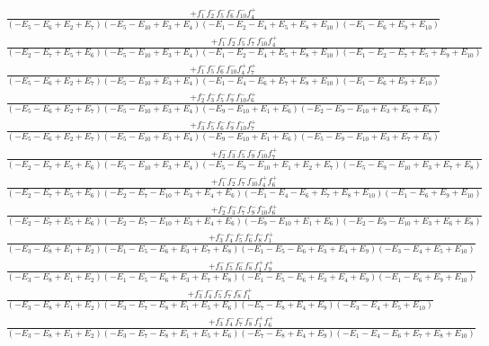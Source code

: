 \documentclass{article}
\begin{document}
\[\begin{array}{rcl}
\frac{+f_{1}^{-}f_{2}^{-}f_{5}^{-}f_{6}^{-}f_{10}^{-}f_{4}^{+}}{(-E_{5}-E_{6}+E_{2}+E_{7})(-E_{5}-E_{10}+E_{3}+E_{4})(-E_{1}-E_{2}-E_{4}+E_{5}+E_{8}+E_{10})(-E_{1}-E_{6}+E_{9}+E_{10})}\\
\frac{+f_{1}^{-}f_{2}^{-}f_{5}^{-}f_{7}^{-}f_{10}^{-}f_{4}^{+}}{(-E_{2}-E_{7}+E_{5}+E_{6})(-E_{5}-E_{10}+E_{3}+E_{4})(-E_{1}-E_{2}-E_{4}+E_{5}+E_{8}+E_{10})(-E_{1}-E_{2}-E_{7}+E_{5}+E_{9}+E_{10})}\\
\frac{+f_{1}^{-}f_{5}^{-}f_{6}^{-}f_{10}^{-}f_{4}^{+}f_{7}^{+}}{(-E_{5}-E_{6}+E_{2}+E_{7})(-E_{5}-E_{10}+E_{3}+E_{4})(-E_{1}-E_{4}-E_{6}+E_{7}+E_{8}+E_{10})(-E_{1}-E_{6}+E_{9}+E_{10})}\\
\frac{+f_{2}^{-}f_{3}^{-}f_{5}^{-}f_{9}^{-}f_{10}^{-}f_{6}^{+}}{(-E_{5}-E_{6}+E_{2}+E_{7})(-E_{5}-E_{10}+E_{3}+E_{4})(-E_{9}-E_{10}+E_{1}+E_{6})(-E_{2}-E_{9}-E_{10}+E_{3}+E_{6}+E_{8})}\\
\frac{+f_{3}^{-}f_{5}^{-}f_{6}^{-}f_{9}^{-}f_{10}^{-}f_{7}^{+}}{(-E_{5}-E_{6}+E_{2}+E_{7})(-E_{5}-E_{10}+E_{3}+E_{4})(-E_{9}-E_{10}+E_{1}+E_{6})(-E_{5}-E_{9}-E_{10}+E_{3}+E_{7}+E_{8})}\\
\frac{+f_{2}^{-}f_{3}^{-}f_{5}^{-}f_{9}^{-}f_{10}^{-}f_{7}^{+}}{(-E_{2}-E_{7}+E_{5}+E_{6})(-E_{5}-E_{10}+E_{3}+E_{4})(-E_{5}-E_{9}-E_{10}+E_{1}+E_{2}+E_{7})(-E_{5}-E_{9}-E_{10}+E_{3}+E_{7}+E_{8})}\\
\frac{+f_{1}^{-}f_{2}^{-}f_{7}^{-}f_{10}^{-}f_{4}^{+}f_{6}^{+}}{(-E_{2}-E_{7}+E_{5}+E_{6})(-E_{2}-E_{7}-E_{10}+E_{3}+E_{4}+E_{6})(-E_{1}-E_{4}-E_{6}+E_{7}+E_{8}+E_{10})(-E_{1}-E_{6}+E_{9}+E_{10})}\\
\frac{+f_{2}^{-}f_{3}^{-}f_{7}^{-}f_{9}^{-}f_{10}^{-}f_{6}^{+}}{(-E_{2}-E_{7}+E_{5}+E_{6})(-E_{2}-E_{7}-E_{10}+E_{3}+E_{4}+E_{6})(-E_{9}-E_{10}+E_{1}+E_{6})(-E_{2}-E_{9}-E_{10}+E_{3}+E_{6}+E_{8})}\\
\frac{+f_{3}^{-}f_{4}^{-}f_{5}^{-}f_{6}^{-}f_{8}^{-}f_{1}^{+}}{(-E_{3}-E_{8}+E_{1}+E_{2})(-E_{1}-E_{5}-E_{6}+E_{3}+E_{7}+E_{8})(-E_{1}-E_{5}-E_{6}+E_{3}+E_{4}+E_{9})(-E_{3}-E_{4}+E_{5}+E_{10})}\\
\frac{+f_{3}^{-}f_{5}^{-}f_{6}^{-}f_{8}^{-}f_{1}^{+}f_{9}^{+}}{(-E_{3}-E_{8}+E_{1}+E_{2})(-E_{1}-E_{5}-E_{6}+E_{3}+E_{7}+E_{8})(-E_{1}-E_{5}-E_{6}+E_{3}+E_{4}+E_{9})(-E_{1}-E_{6}+E_{9}+E_{10})}\\
\frac{+f_{3}^{-}f_{4}^{-}f_{5}^{-}f_{7}^{-}f_{8}^{-}f_{1}^{+}}{(-E_{3}-E_{8}+E_{1}+E_{2})(-E_{3}-E_{7}-E_{8}+E_{1}+E_{5}+E_{6})(-E_{7}-E_{8}+E_{4}+E_{9})(-E_{3}-E_{4}+E_{5}+E_{10})}\\
\frac{+f_{3}^{-}f_{4}^{-}f_{7}^{-}f_{8}^{-}f_{1}^{+}f_{6}^{+}}{(-E_{3}-E_{8}+E_{1}+E_{2})(-E_{3}-E_{7}-E_{8}+E_{1}+E_{5}+E_{6})(-E_{7}-E_{8}+E_{4}+E_{9})(-E_{1}-E_{4}-E_{6}+E_{7}+E_{8}+E_{10})}\\

\end{array}\]
\end{document}
